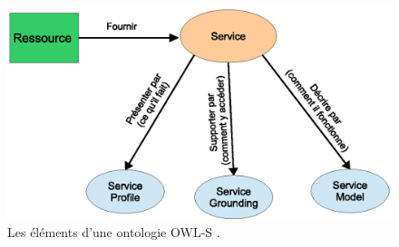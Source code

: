 \begin{figure}[h]
    \centering
    \includegraphics[width=1.1\textwidth]{figs/owls.eps}
    \caption{Les éléments d'une ontologie \textsc{OWL-S}
      \cite{bartalos2011effective}.}
    \label{fig:owl-s}
\end{figure}

